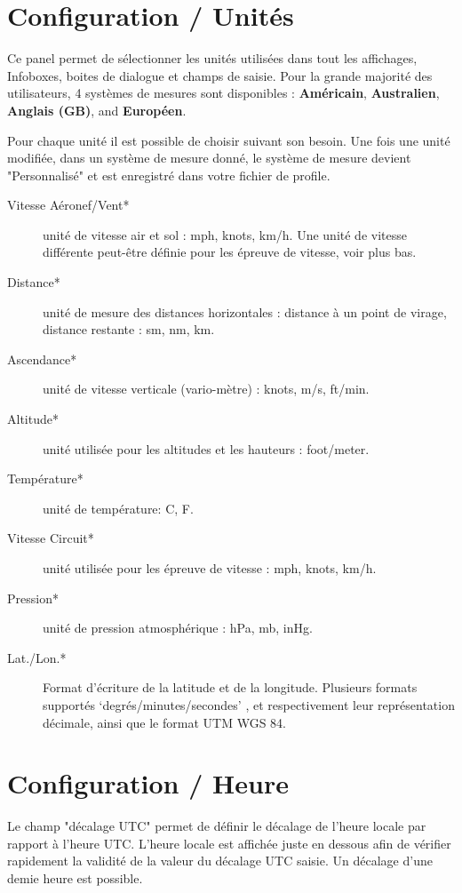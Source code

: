 \section{Configuration / Unités}

Ce panel permet de sélectionner les unités utilisées dans tout les affichages, Infoboxes, boites de dialogue et champs de saisie. Pour la grande majorité des utilisateurs, 4 systèmes de mesures sont disponibles : {\bf Américain}, {\bf Australien}, {\bf Anglais (GB)}, and {\bf Européen}.

Pour chaque unité il est possible de choisir suivant son besoin. Une fois une unité modifiée, dans un système de mesure donné, le système de mesure devient "Personnalisé" et est enregistré dans votre fichier de profile.

\begin{description}
\item[Vitesse Aéronef/Vent*]  unité de vitesse air et sol : mph, knots, km/h. Une unité de vitesse différente peut-être définie pour les épreuve de vitesse, voir plus bas.
\item[Distance*]  unité de mesure des distances horizontales : distance à un point de virage, distance restante : sm, nm, km.
\item[Ascendance*]  unité de vitesse verticale (vario-mètre) : knots, m/s, ft/min.
\item[Altitude*] unité utilisée pour les altitudes et les hauteurs : foot/meter.
\item[Température*]  unité de température: \degree C, \degree F.
\item[Vitesse Circuit*] unité utilisée pour les épreuve de vitesse : mph, knots, km/h.
\item[Pression*]  unité de pression atmosphérique : hPa, mb, inHg.
\item[Lat./Lon.*]  Format d'écriture de la latitude et de la longitude. Plusieurs formats supportés  `degrés/minutes/secondes' , et respectivement leur représentation décimale, ainsi que le format UTM WGS 84.
\end{description}


\section{Configuration / Heure}

Le champ "décalage UTC" permet de définir le décalage de l'heure locale par rapport à l'heure UTC.
L'heure locale est affichée juste en dessous afin de vérifier rapidement la validité de la valeur du décalage UTC saisie. Un décalage d'une demie heure est possible.


